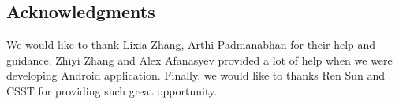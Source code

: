 \documentclass[a0,portrait]{poster}
\begin{document}
\begin{multicols}{2}
\nocite{*} %


\section*{Acknowledgments}

We would like to thank Lixia Zhang, Arthi Padmanabhan for their help and guidance. Zhiyi Zhang and Alex Afanasyev provided a lot of help when we were developing Android application. Finally, we would like to thanks Ren Sun and CSST for providing such great opportunity.

\end{multicols}
\end{document}
